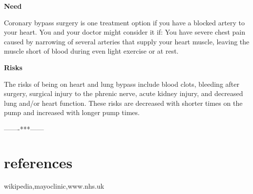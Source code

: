 \documentclass[12pt]{article}
\begin{document}
\LARGE\flushleft\textbf{Need}

\large\flushleft Coronary bypass surgery is one treatment option if you have a blocked artery to your heart. You and your doctor might consider it if: You have severe chest pain caused by narrowing of several arteries that supply your heart muscle, leaving the muscle short of blood during even light exercise or at rest.

\LARGE\flushleft\textbf{Risks}

\large\flushleft The risks of being on heart and lung bypass include blood clots, bleeding after surgery, surgical injury to the phrenic nerve, acute kidney injury, and decreased lung and/or heart function. These risks are decreased with shorter times on the pump and increased with longer pump times. 



\vspace{1.5cm}

\centering\huge-------***------
\pagebreak

\section{\LARGE\centering references}
\large\flushleft wikipedia,mayoclinic,www.nhs.uk
\end{document}
